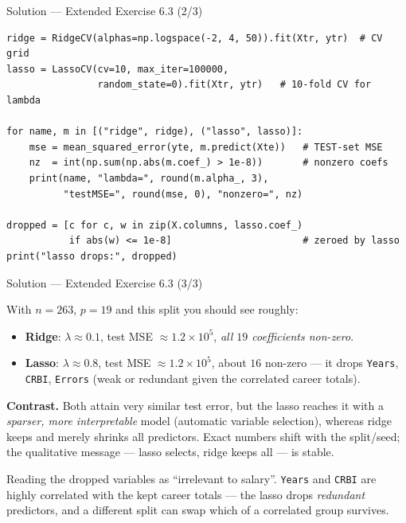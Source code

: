 \documentclass[aspectratio=169,11pt]{beamer}
\begin{document}
\begin{frame}[fragile]{Solution --- Extended Exercise 6.3 (2/3)}
  \begin{lstlisting}
ridge = RidgeCV(alphas=np.logspace(-2, 4, 50)).fit(Xtr, ytr)  # CV grid
lasso = LassoCV(cv=10, max_iter=100000,
                random_state=0).fit(Xtr, ytr)   # 10-fold CV for lambda

for name, m in [("ridge", ridge), ("lasso", lasso)]:
    mse = mean_squared_error(yte, m.predict(Xte))   # TEST-set MSE
    nz  = int(np.sum(np.abs(m.coef_) > 1e-8))       # nonzero coefs
    print(name, "lambda=", round(m.alpha_, 3),
          "testMSE=", round(mse, 0), "nonzero=", nz)

dropped = [c for c, w in zip(X.columns, lasso.coef_)
           if abs(w) <= 1e-8]                       # zeroed by lasso
print("lasso drops:", dropped)
  \end{lstlisting}
\end{frame}

\begin{frame}{Solution --- Extended Exercise 6.3 (3/3)}
  \begin{solutionbox}
    With $n=263$, $p=19$ and this split you should see roughly:
    \begin{itemize}
      \item \textbf{Ridge}: $\lambda\approx0.1$, test MSE
            $\approx1.2\times10^5$, \emph{all $19$ coefficients
            non-zero}.
      \item \textbf{Lasso}: $\lambda\approx0.8$, test MSE
            $\approx1.2\times10^5$, about $16$ non-zero --- it drops
            \texttt{Years}, \texttt{CRBI}, \texttt{Errors} (weak or
            redundant given the correlated career totals).
    \end{itemize}
    \textbf{Contrast.} Both attain very similar test error, but the lasso
    reaches it with a \emph{sparser, more interpretable} model (automatic
    variable selection), whereas ridge keeps and merely shrinks all
    predictors. Exact numbers shift with the split/seed; the qualitative
    message --- lasso selects, ridge keeps all --- is stable.
  \end{solutionbox}
  \begin{mistake}
    Reading the dropped variables as ``irrelevant to salary''.
    \texttt{Years} and \texttt{CRBI} are highly correlated with the kept
    career totals --- the lasso drops \emph{redundant} predictors, and a
    different split can swap which of a correlated group survives.
  \end{mistake}
\end{frame}
\end{document}
